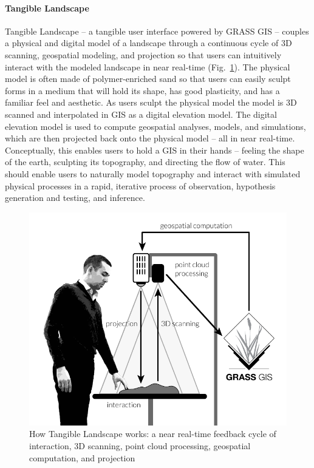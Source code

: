 \documentclass{isprs}
\begin{document}

\paragraph{Tangible Landscape}
Tangible Landscape -- a tangible user interface powered by GRASS GIS --
couples a physical and digital model of a landscape through a continuous cycle of 3D scanning, geospatial modeling, and projection
so that users can intuitively interact with the modeled landscape in near real-time 
(Fig.~\ref{fig:system_schema}). 
%
The physical model is often made of polymer-enriched sand so that users can easily sculpt forms in a medium that will hold its shape, has good plasticity, and has a familiar feel and aesthetic. 
% 
As users sculpt the physical model
the model is 3D scanned and
interpolated in GIS as a digital elevation model. 
The digital elevation model is used to compute 
geospatial analyses, models, and simulations, 
which are then projected back onto the physical model 
-- all in near real-time.
%
Conceptually, this enables users to hold a GIS in their hands -- 
feeling the shape of the earth, sculpting its topography, and directing the flow of water.
%
This should enable users to naturally model topography and interact with simulated physical processes in a rapid, iterative process 
of observation, hypothesis generation and testing, and inference. 

\begin{figure}[ht!]
\begin{center}
\includegraphics[width=1.0\columnwidth]{figures/system_schema_2.pdf}
\caption{How Tangible Landscape works: a near real-time feedback cycle of interaction, 3D scanning, point cloud processing, geospatial computation, and projection}
\label{fig:system_schema}
\end{center}
\end{figure}
\end{document}
